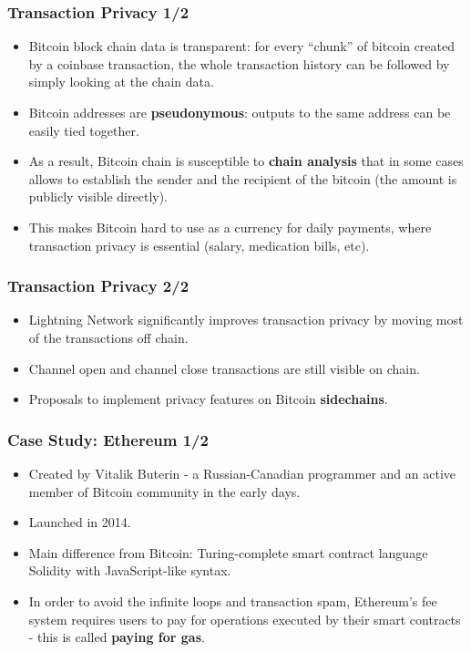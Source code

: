 \documentclass{beamer}
\begin{document}
\begin{frame}
  \frametitle{Transaction Privacy 1/2}
  \begin{itemize}
  \item Bitcoin block chain data is transparent: for every ``chunk'' of bitcoin
    created by a coinbase transaction, the whole transaction history can be
    followed by simply looking at the chain data.
  \item Bitcoin addresses are \textbf{pseudonymous}: outputs to the same address
    can be easily tied together.
  \item As a result, Bitcoin chain is susceptible to \textbf{chain analysis}
    that in some cases allows to establish the sender and the recipient of the
    bitcoin (the amount is publicly visible directly).
  \item This makes Bitcoin hard to use as a currency for daily payments, where
    transaction privacy is essential (salary, medication bills, etc).
  \end{itemize}
\end{frame}

\begin{frame}
  \frametitle{Transaction Privacy 2/2}
  \begin{itemize}
  \item Lightning Network significantly improves transaction privacy by moving
    most of the transactions off chain.
  \item Channel open and channel close transactions are still visible on chain.
  \item Proposals to implement privacy features on Bitcoin \textbf{sidechains}.
  \end{itemize}
\end{frame}

\begin{frame}
  \frametitle{Case Study: Ethereum 1/2}
  \begin{itemize}
  \item Created by Vitalik Buterin - a Russian-Canadian programmer and an active
    member of Bitcoin community in the early days.
  \item Launched in 2014.
  \item Main difference from Bitcoin: Turing-complete smart contract language
    Solidity with JavaScript-like syntax.
  \item In order to avoid the infinite loops and transaction spam, Ethereum's
    fee system requires users to pay for operations executed by their smart
    contracts - this is called \textbf{paying for gas}.
  \end{itemize}
\end{frame}
\end{document}
